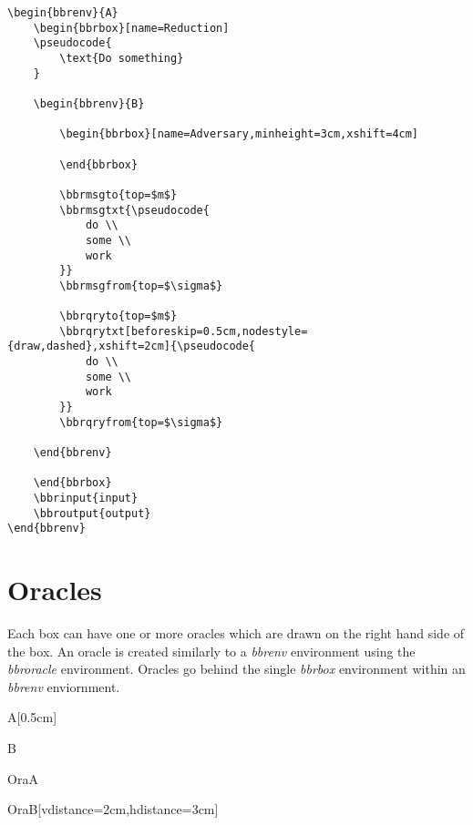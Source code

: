 \documentclass[a4paper]{report}
\begin{document}
\begin{lstlisting}
\begin{bbrenv}{A}
	\begin{bbrbox}[name=Reduction]
	\pseudocode{
		\text{Do something} 
	}

	\begin{bbrenv}{B}

		\begin{bbrbox}[name=Adversary,minheight=3cm,xshift=4cm]

		\end{bbrbox}
		
		\bbrmsgto{top=$m$}
		\bbrmsgtxt{\pseudocode{
			do \\
			some \\
			work
		}}
		\bbrmsgfrom{top=$\sigma$}

		\bbrqryto{top=$m$}
		\bbrqrytxt[beforeskip=0.5cm,nodestyle={draw,dashed},xshift=2cm]{\pseudocode{
			do \\
			some \\
			work
		}}
		\bbrqryfrom{top=$\sigma$}

	\end{bbrenv}

	\end{bbrbox}
	\bbrinput{input}
	\bbroutput{output}
\end{bbrenv}
\end{lstlisting}

\section{Oracles}
Each box can have one or more oracles which are drawn on the right hand side of the box. An oracle
is created similarly to a \emph{bbrenv} environment using the \emph{bbroracle} environment. Oracles
go behind the single \emph{bbrbox} environment within an \emph{bbrenv} enviornment.

\begin{bbrenv}[1cm]{A}[0.5cm]
	\begin{bbrbox}[name=Reduction]

	\begin{bbrenv}{B}
		\begin{bbrbox}[name=Adversary,minheight=3cm,xshift=4cm]
		\end{bbrbox}

	\end{bbrenv}

	\end{bbrbox}

	\begin{bbroracle}{OraA}
		\begin{bbrbox}[name=Oracle 1]
		\end{bbrbox}
	\end{bbroracle}

	\begin{bbroracle}{OraB}[vdistance=2cm,hdistance=3cm]
		\begin{bbrbox}[name=Oracle 2]
		\end{bbrbox}
	\end{bbroracle}
\end{bbrenv}
\end{document}
